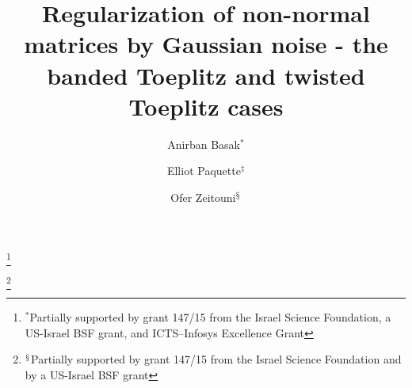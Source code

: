 \documentclass{amsart}
\numberwithin{equation}{section}
\begin{document}
\title[Regularization of non-normal matrices] {Regularization of non-normal matrices by Gaussian noise - the banded Toeplitz
and twisted Toeplitz cases}
\author[A.\ Basak]{Anirban Basak$^*$}\thanks{${}^*$Partially supported by
 grant 147/15 from the Israel Science Foundation, a US-Israel BSF grant, and ICTS--Infosys Excellence Grant}
 \address{$^*$International Centre for Theoretical Sciences
 \newline\indent Tata Institute of Fundamental Research
 \newline\indent Bangalore 560089, India
 \newline\indent and
 \newline\indent Department of Mathematics, Weizmann Institute of Science
 \newline\indent POB 26, Rehovot 76100, Israel}
 \author[E.\ Paquette]{Elliot Paquette$^\ddagger$}%
 \address{$^\ddagger$Department of Mathematics, The Ohio State University
 \newline\indent Tower 100, 231 W 18th Ave, Columbus, Ohio 43210, USA}
\author[O.\ Zeitouni]{Ofer Zeitouni$^{\mathsection}$}\thanks{${}^{\mathsection}$Partially supported by
 grant 147/15 from the Israel Science Foundation and by a US-Israel BSF grant}
 \address{$^{\mathsection}$Department of Mathematics, Weizmann Institute of Science
 \newline\indent POB 26, Rehovot 76100, Israel
 \newline \indent and
 \newline\indent Courant Institute, New York University
 \newline {} Mercer St, New York, NY 10012, USA}

\end{document}
